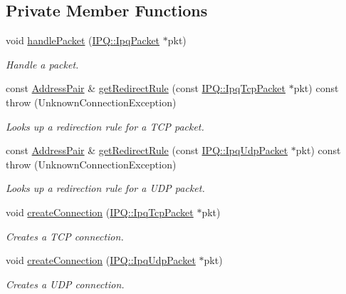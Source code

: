 \subsection*{\-Private \-Member \-Functions}
\begin{DoxyCompactItemize}
\item 
void \hyperlink{classNERD_1_1ConnectionServer_a5b183a39539b07fe4a92ef3ad88d7c92}{handle\-Packet} (\hyperlink{classIPQ_1_1IpqPacket}{\-I\-P\-Q\-::\-Ipq\-Packet} $\ast$pkt)
\begin{DoxyCompactList}\small\item\em \-Handle a packet. \end{DoxyCompactList}\item 
const \hyperlink{structNERD_1_1ConnectionServer_1_1AddressPair}{\-Address\-Pair} \& \hyperlink{classNERD_1_1ConnectionServer_afd85b7ad69696355650a0177d01f0a06}{get\-Redirect\-Rule} (const \hyperlink{classIPQ_1_1IpqTcpPacket}{\-I\-P\-Q\-::\-Ipq\-Tcp\-Packet} $\ast$pkt) const   throw (\-Unknown\-Connection\-Exception)
\begin{DoxyCompactList}\small\item\em \-Looks up a redirection rule for a \-T\-C\-P packet. \end{DoxyCompactList}\item 
const \hyperlink{structNERD_1_1ConnectionServer_1_1AddressPair}{\-Address\-Pair} \& \hyperlink{classNERD_1_1ConnectionServer_aca2ea51c7622b3ecb11cbaa976b9a137}{get\-Redirect\-Rule} (const \hyperlink{classIPQ_1_1IpqUdpPacket}{\-I\-P\-Q\-::\-Ipq\-Udp\-Packet} $\ast$pkt) const   throw (\-Unknown\-Connection\-Exception)
\begin{DoxyCompactList}\small\item\em \-Looks up a redirection rule for a \-U\-D\-P packet. \end{DoxyCompactList}\item 
void \hyperlink{classNERD_1_1ConnectionServer_af4ba681fed213914c83661a1dfd8df6d}{create\-Connection} (\hyperlink{classIPQ_1_1IpqTcpPacket}{\-I\-P\-Q\-::\-Ipq\-Tcp\-Packet} $\ast$pkt)
\begin{DoxyCompactList}\small\item\em \-Creates a \-T\-C\-P connection. \end{DoxyCompactList}\item 
void \hyperlink{classNERD_1_1ConnectionServer_ae713c47afe1f248809de764dfda4f1b2}{create\-Connection} (\hyperlink{classIPQ_1_1IpqUdpPacket}{\-I\-P\-Q\-::\-Ipq\-Udp\-Packet} $\ast$pkt)
\begin{DoxyCompactList}\small\item\em \-Creates a \-U\-D\-P connection. \end{DoxyCompactList}\item 

\end{DoxyCompactItemize}
